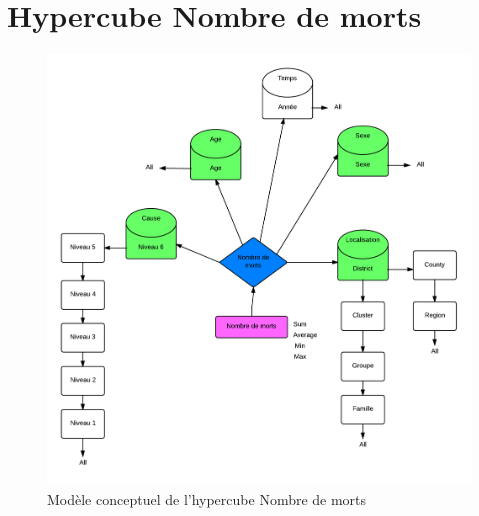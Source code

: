 \section{Hypercube Nombre de morts}
\begin{figure}[h!]
    \centering
    \includegraphics[width=\linewidth]{images/cubeNbMorts.png}
    \caption{Modèle conceptuel de l'hypercube Nombre de morts}
    \label{conception_cube_nombre_morts}
\end{figure}

